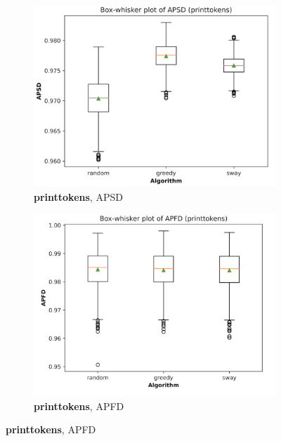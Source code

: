 \documentclass[10pt,journal,compsoc]{IEEEtran}
\begin{document}
	\begin{figure}
		\centering
		
		\begin{subfigure}[b]{0.4\linewidth}
			\centering
			\includegraphics[width=\textwidth]{figures/APSD_printtokens.png}
			\caption{{\bf printtokens}, APSD}
		\end{subfigure}
		\hfill
		\begin{subfigure}[b]{0.4\linewidth}
			\centering
			\includegraphics[width=\textwidth]{figures/APFD_printtokens.png}
			\caption{{\bf printtokens}, APFD}
		\end{subfigure}
		
		\vfill
		

\end{figure}
\end{document}
